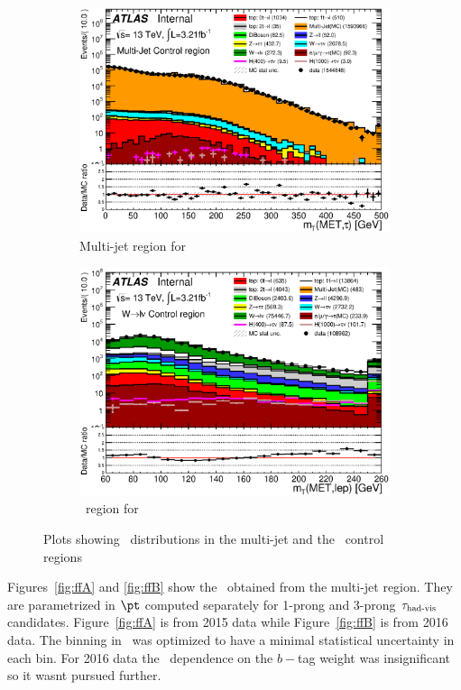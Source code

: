 \begin{figure}[!h]
\begin{subfigure}{0.5\textwidth}
   \includegraphics[width=\textwidth]{figures/data15_QCD_MT_log.eps}
\caption{Multi-jet region for \FF}
\label{fig:multiCR}
\end{subfigure} %
\begin{subfigure}{0.5\textwidth}
   \includegraphics[width=\textwidth]{figures/data15_WCR_WlepMT_log.eps}
\caption{\Wjets\ region for \FF}
\label{fig:wjetsFFcr}
\end{subfigure}
\caption{Plots showing \mT\ distributions in the multi-jet and the \Wjets\ control regions}
\end{figure}

\par Figures~\ref{fig:ffA} and \ref{fig:ffB} show the \FF\ obtained from the multi-jet region. 
They are parametrized in $\pt$ computed separately for 1-prong and 3-prong $\tau_{\text{had-vis}}$ candidates. 
Figure~\ref{fig:ffA} is from 2015 data while Figure~\ref{fig:ffB} is from 2016 data. The binning in 
\pt\ was optimized to have a minimal statistical uncertainty in each bin. For 2016 data the \FF\ dependence 
on the $b-$tag weight was insignificant so it wasnt pursued further.   


